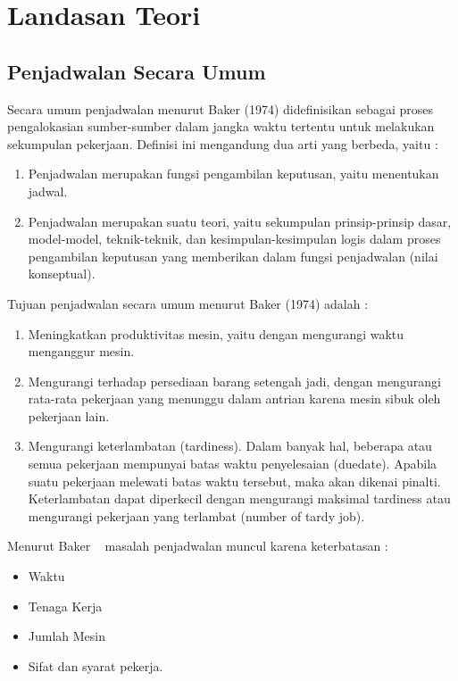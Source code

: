 \chapter{Landasan Teori}
\label{chap:teori}

\section{Penjadwalan Secara Umum}
\label{sec:penjadwalan} 
 Secara umum penjadwalan menurut Baker (1974) didefinisikan sebagai proses pengalokasian sumber-sumber dalam jangka waktu tertentu untuk melakukan sekumpulan pekerjaan. Definisi ini mengandung dua arti yang berbeda, yaitu :
 \begin{enumerate}
 	\item Penjadwalan merupakan fungsi pengambilan keputusan, yaitu menentukan jadwal. 
 	\item Penjadwalan merupakan suatu teori, yaitu sekumpulan prinsip-prinsip dasar, model-model, teknik-teknik, dan kesimpulan-kesimpulan logis dalam proses pengambilan keputusan yang memberikan dalam fungsi penjadwalan (nilai konseptual).
 \end{enumerate}
	Tujuan penjadwalan secara umum menurut Baker (1974) adalah :
\begin{enumerate}
	\item Meningkatkan produktivitas mesin, yaitu dengan mengurangi waktu menganggur mesin.
	\item Mengurangi terhadap persediaan barang setengah jadi, dengan mengurangi rata-rata pekerjaan yang menunggu dalam antrian karena mesin sibuk oleh pekerjaan lain.
	\item Mengurangi keterlambatan (tardiness). Dalam banyak hal, beberapa atau semua pekerjaan mempunyai batas waktu penyelesaian (duedate). Apabila suatu pekerjaan melewati batas waktu tersebut, maka akan dikenai pinalti. Keterlambatan dapat diperkecil dengan mengurangi maksimal tardiness atau mengurangi pekerjaan yang terlambat (number of  tardy job).
\end{enumerate}
	Menurut Baker ~\cite{baker:1974:introduction} masalah penjadwalan muncul karena keterbatasan :
	\begin{itemize}
		\item Waktu
		\item Tenaga Kerja
		\item Jumlah Mesin
		\item Sifat dan syarat pekerja.
	\end{itemize}

